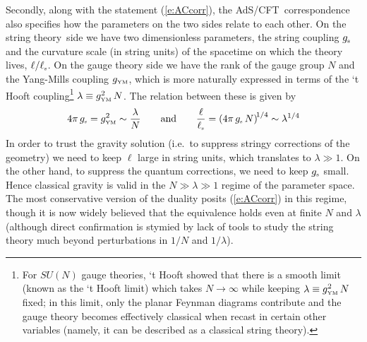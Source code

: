 \documentclass[12pt,a4paper]{article}
\def\req#1{(\ref{#1})}
\def\AC{AdS/CFT}
\def\STY{string theory}
\def\gst{g_{\scriptscriptstyle {\rm s}}}
\def\gYM{g_{\scriptscriptstyle {\rm YM}}}
\def\lst{\ell_{\scriptscriptstyle {\rm s}}}
\def\Rads{\ell}
\def\andeq{\qquad {\rm and} \qquad}
\begin{document}
Secondly, along with the statement \req{e:ACcorr}, the \AC\ correspondence also specifies how the parameters on the two sides  relate to each other.
On the \STY\ side we have two dimensionless parameters, the string coupling $\gst$ and the curvature scale (in string units) of the spacetime on which the theory lives,  $\Rads/\lst$.  On the gauge theory side we have the rank of the gauge group $N$ and the Yang-Mills coupling $\gYM$, which is more naturally expressed in terms of the `t Hooft coupling\footnote{
For $SU(N)$ gauge theories,  `t Hooft \cite{tHooft:1973jz} showed that there is a smooth limit (known as the `t Hooft limit) which takes $N\to \infty$ while keeping $\lambda \equiv  \gYM^2 \, N$ fixed; in this limit, only the planar Feynman diagrams contribute and the gauge theory becomes effectively classical when recast in certain other variables (namely, it can be described as a classical string theory).}
 $\lambda \equiv  \gYM^2 \, N$.
The relation between these is given by 
%
\begin{equation}
4 \pi \, \gst = \gYM^2  \sim \frac{\lambda}{N}
\andeq
\frac{\Rads}{\lst} 
= \left( 4 \pi \, \gst \, N \right)^{\! 1/4} \sim \lambda^{1/4}
\label{e:pars}
\end{equation}	
%
In order to trust the gravity solution (i.e.\ to suppress stringy corrections of the geometry) we need to keep $\Rads$ large in string units, which translates to $\lambda \gg 1$.  
On the other hand, to suppress the quantum corrections, we need to keep $\gst $ small.  
Hence classical gravity is valid in the $N \gg \lambda \gg 1$ regime of the parameter space.  The most conservative version of the duality posits \req{e:ACcorr} in this regime, though it is now widely believed that the equivalence holds even at finite $N$ and $\lambda$ (although direct confirmation is stymied by lack of tools to study the string theory much  beyond perturbations in $1/N$ and $1/\lambda$).
\end{document}

